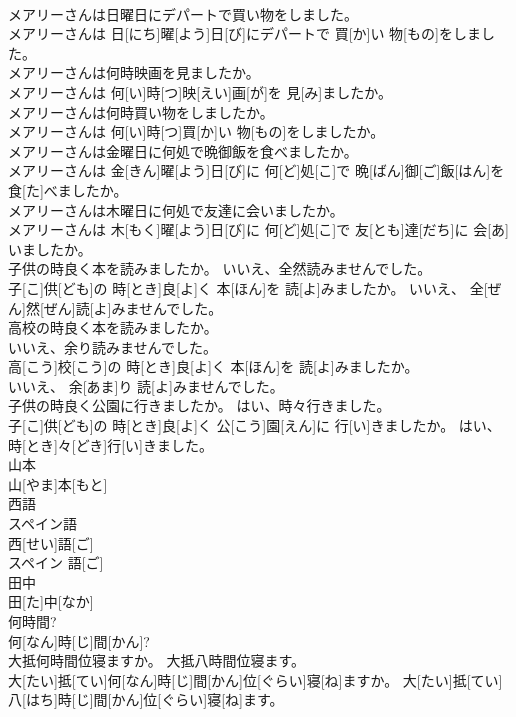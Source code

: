 \documentclass[8pt]{extreport}
\begin{document}
\begin{CJK}{UTF8}{min}
\\	メアリーさんは日曜日にデパートで買い物をしました。	
\\	メアリーさんは 日[にち]曜[よう]日[び]にデパートで 買[か]い 物[もの]をしました。
\\	メアリーさんは何時映画を見ましたか。	
\\	メアリーさんは 何[い]時[つ]映[えい]画[が]を 見[み]ましたか。
\\	メアリーさんは何時買い物をしましたか。	
\\	メアリーさんは 何[い]時[つ]買[か]い 物[もの]をしましたか。
\\	メアリーさんは金曜日に何処で晩御飯を食べましたか。	
\\	メアリーさんは 金[きん]曜[よう]日[び]に 何[ど]処[こ]で 晩[ばん]御[ご]飯[はん]を 食[た]べましたか。
\\	メアリーさんは木曜日に何処で友達に会いましたか。	
\\	メアリーさんは 木[もく]曜[よう]日[び]に 何[ど]処[こ]で 友[とも]達[だち]に 会[あ]いましたか。
\\	子供の時良く本を読みましたか。 いいえ、全然読みませんでした。	
\\	子[こ]供[ども]の 時[とき]良[よ]く 本[ほん]を 読[よ]みましたか。 いいえ、 全[ぜん]然[ぜん]読[よ]みませんでした。
\\	高校の時良く本を読みましたか。 
\\	いいえ、余り読みませんでした。	
\\	高[こう]校[こう]の 時[とき]良[よ]く 本[ほん]を 読[よ]みましたか。 
\\	いいえ、 余[あま]り 読[よ]みませんでした。
\\	子供の時良く公園に行きましたか。 はい、時々行きました。	
\\	子[こ]供[ども]の 時[とき]良[よ]く 公[こう]園[えん]に 行[い]きましたか。 はい、 時[とき]々[どき]行[い]きました。
\\	山本	
\\	山[やま]本[もと]	
\\	西語 
\\	スペイン語	
\\	西[せい]語[ご] 
\\	スペイン 語[ご]	
\\	田中	
\\	田[た]中[なか]	
\\	何時間?	
\\	何[なん]時[じ]間[かん]?
\\	大抵何時間位寝ますか。 大抵八時間位寝ます。	
\\	大[たい]抵[てい]何[なん]時[じ]間[かん]位[ぐらい]寝[ね]ますか。 大[たい]抵[てい]八[はち]時[じ]間[かん]位[ぐらい]寝[ね]ます。

\end{CJK}
\end{document}
